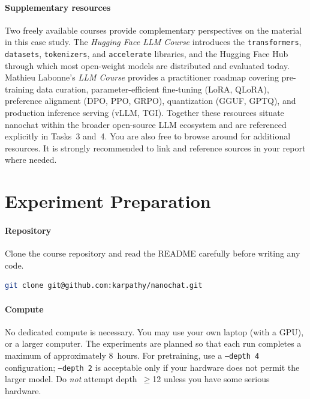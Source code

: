 \paragraph{Supplementary resources}  Two freely available courses provide complementary perspectives on the material in this case study.  The \textit{Hugging Face LLM Course} \citep{huggingface2022course} introduces the \texttt{transformers}, \texttt{datasets}, \texttt{tokenizers}, and \texttt{accelerate} libraries, and the Hugging Face Hub through which most open-weight models are distributed and evaluated today. Mathieu Labonne's \textit{LLM Course} \citep{labonne2023llmcourse} provides a practitioner roadmap covering pre-training data curation, parameter-efficient fine-tuning (LoRA, QLoRA), preference alignment (DPO, PPO, GRPO), quantization (GGUF, GPTQ), and production inference serving (vLLM, TGI).  Together these resources situate nanochat within the broader open-source LLM ecosystem and are referenced explicitly in Tasks~3 and~4. You are also free to browse around for additional resources. It is strongly recommended to link and reference sources in your report where needed.

\section{Experiment Preparation}
\label{sec:preparation}

\paragraph{Repository}  Clone the course repository and read the README carefully before writing any code.

\begin{lstlisting}[language=bash, caption={Cloning the nanochat repository}]
git clone git@github.com:karpathy/nanochat.git
\end{lstlisting}

\paragraph{Compute}  No dedicated compute is necessary. You may use your own laptop (with a GPU), or a larger computer. %
The experiments are planned  so that each run completes a maximum of approximately 8~hours. For pretraining, use a \texttt{--depth~4} configuration; \texttt{--depth~2} is acceptable only if your hardware does not permit the larger model. Do \emph{not} attempt depth~$\geq$12 unless you have some serious hardware.

